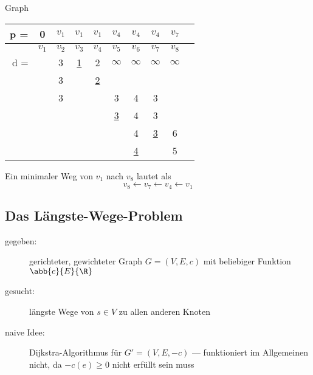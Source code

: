 \begin{beispiel}
	Graph

	\begin{tabular}{rccccccccc}
		p = & 0 & $v_1$ & $v_1$ & $v_1$ & $v_4$ & $v_4$ & $v_4$ & \cancel{$v_5$} $v_7$ \\ \hline
		    & $v_1$ & $v_2$ & $v_3$ & $v_4$ & $v_5$ & $v_6$ & $v_7$ & $v_8$ \\ \hline
		d = & \fbox{0} & 3 & \uline{1} & 2 & $\infty$ & $\infty$ & $\infty$ & $\infty$ \\
			&          & 3 &           & \uline{2} & &  & &  \\
			&          & 3 &           &        & 3         & 4 & 3 & \\
			&          &   &           &        & \uline{3} & 4 & 3 & \\
			&          &   &           &        &           & 4 & \uline{3} & 6 \\
			&          &   &           &        &           & \uline{4} &           & 5 \\
	\end{tabular}

	Ein minimaler Weg von $v_1$ nach $v_8$ lautet als
	\begin{equation*}
		v_8 \leftarrow v_7 \leftarrow v_4 \leftarrow v_1
	\end{equation*}
\end{beispiel}


\subsection{Das Längste-Wege-Problem}
\begin{description}
	\item[gegeben:] gerichteter, gewichteter Graph $G = (V,E,c)$ mit beliebiger Funktion $\abb{c}{E}{\R}$
	\item[gesucht:] längste Wege von $s \in V$ zu allen anderen Knoten
	\item[naive Idee:] Dijkstra-Algorithmus für $G' = (V,E,-c)$ --- funktioniert im Allgemeinen nicht, da $-c(e) \ge 0$ nicht erfüllt sein muss
\end{description}

